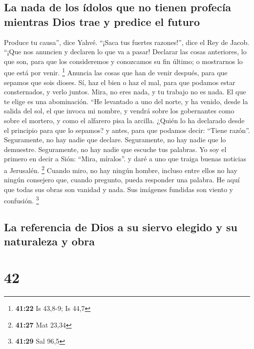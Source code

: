 \hypertarget{la-nada-de-los-uxeddolos-que-no-tienen-profecuxeda-mientras-dios-trae-y-predice-el-futuro}{%
\subsection{La nada de los ídolos que no tienen profecía mientras Dios
trae y predice el
futuro}\label{la-nada-de-los-uxeddolos-que-no-tienen-profecuxeda-mientras-dios-trae-y-predice-el-futuro}}

 Produce tu causa'', dice Yahvé. ``¡Saca tus fuertes
razones!'', dice el Rey de Jacob.  ``¡Que nos anuncien y
declaren lo que va a pasar! Declarar las cosas anteriores, lo que son,
para que los consideremos y conozcamos su fin último; o mostrarnos lo
que está por venir. \footnote{\textbf{41:22} Is 43,8-9; Is 44,7}
 Anuncia las cosas que han de venir después, para que
sepamos que sois dioses. Sí, haz el bien o haz el mal, para que podamos
estar consternados, y verlo juntos.  Mira, no eres nada,
y tu trabajo no es nada. El que te elige es una abominación.
 ``He levantado a uno del norte, y ha venido, desde la
salida del sol, el que invoca mi nombre, y vendrá sobre los gobernantes
como sobre el mortero, y como el alfarero pisa la arcilla.
 ¿Quién lo ha declarado desde el principio para que lo
sepamos? y antes, para que podamos decir: ``Tiene razón''. Seguramente,
no hay nadie que declare. Seguramente, no hay nadie que lo demuestre.
Seguramente, no hay nadie que escuche tus palabras.  Yo
soy el primero en decir a Sión: ``Mira, míralos''. y daré a uno que
traiga buenas noticias a Jerusalén. \footnote{\textbf{41:27} Mat 23,34}
 Cuando miro, no hay ningún hombre, incluso entre ellos
no hay ningún consejero que, cuando pregunto, pueda responder una
palabra.  He aquí que todas sus obras son vanidad y nada.
Sus imágenes fundidas son viento y confusión. \footnote{\textbf{41:29}
  Sal 96,5}

\hypertarget{la-referencia-de-dios-a-su-siervo-elegido-y-su-naturaleza-y-obra}{%
\subsection{La referencia de Dios a su siervo elegido y su naturaleza y
obra}\label{la-referencia-de-dios-a-su-siervo-elegido-y-su-naturaleza-y-obra}}

\hypertarget{section-41}{%
\section{42}\label{section-41}}

